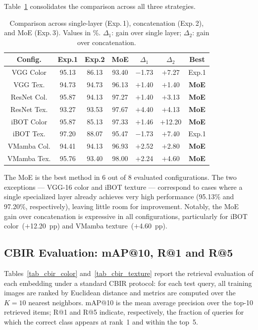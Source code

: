 \documentclass[letterpaper, 10 pt, conference]{ieeeconf}
\begin{document}
Table~\ref{tab_comparacao} consolidates the comparison across all three
strategies.

\begin{table}[htbp]
\caption{Comparison across single-layer (Exp.\,1), concatenation
         (Exp.\,2), and MoE (Exp.\,3). Values in \%. $\Delta_1$: gain
         over single layer; $\Delta_2$: gain over concatenation.}
\begin{center}
\begin{tabular}{c|c|c|c|c|c|c}
\hline
\textbf{Config.} & \textbf{Exp.1} & \textbf{Exp.2}
                 & \textbf{MoE} & \textbf{$\Delta_1$}
                 & \textbf{$\Delta_2$} & \textbf{Best} \\
\hline
VGG Color   & 95.13 & 86.13 & 93.40 & $-$1.73 & $+$7.27  & Exp.1 \\
VGG Tex.    & 94.73 & 94.73 & 96.13 & $+$1.40 & $+$1.40  & \textbf{MoE} \\
ResNet Col. & 95.87 & 94.13 & 97.27 & $+$1.40 & $+$3.13  & \textbf{MoE} \\
ResNet Tex. & 93.27 & 93.53 & 97.67 & $+$4.40 & $+$4.13  & \textbf{MoE} \\
iBOT Color  & 95.87 & 85.13 & 97.33 & $+$1.46 & $+$12.20 & \textbf{MoE} \\
iBOT Tex.   & 97.20 & 88.07 & 95.47 & $-$1.73 & $+$7.40  & Exp.1 \\
VMamba Col. & 94.41 & 94.13 & 96.93 & $+$2.52 & $+$2.80  & \textbf{MoE} \\
VMamba Tex. & 95.76 & 93.40 & 98.00 & $+$2.24 & $+$4.60  & \textbf{MoE} \\
\hline
\end{tabular}
\label{tab_comparacao}
\end{center}
\end{table}

The MoE is the best method in 6 out of 8 evaluated configurations.
The two exceptions — VGG-16 color and iBOT texture — correspond to cases
where a single specialized layer already achieves very high performance
(95.13\% and 97.20\%, respectively), leaving little room for improvement.
Notably, the MoE gain over concatenation is expressive in all
configurations, particularly for iBOT color~($+$12.20~pp) and VMamba
texture~($+$4.60~pp).

\subsection{CBIR Evaluation: mAP@10, R@1 and R@5}

Tables~\ref{tab_cbir_color} and~\ref{tab_cbir_texture} report the
retrieval evaluation of each embedding under a standard CBIR protocol:
for each test query, all training images are ranked by Euclidean distance
and metrics are computed over the $K\!=\!10$ nearest neighbors.
mAP@10 is the mean average precision over the top-10 retrieved items;
R@1 and R@5 indicate, respectively, the fraction of queries for which
the correct class appears at rank~1 and within the top~5.
\end{document}
